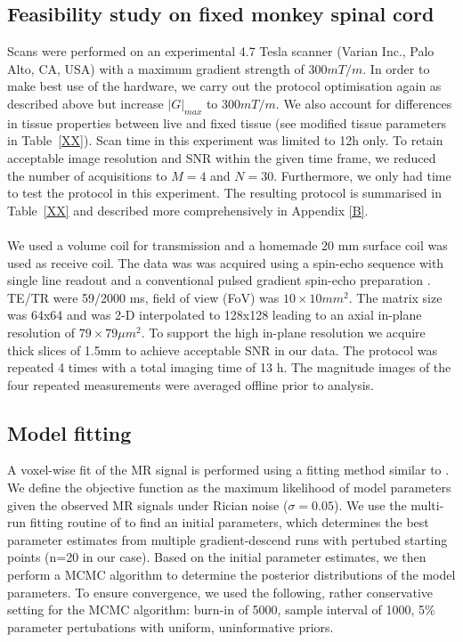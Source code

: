 \subsection{Feasibility study on fixed monkey spinal cord}
Scans were performed on an experimental 4.7 Tesla scanner (Varian Inc., Palo Alto, CA, USA) with a maximum gradient strength of $300mT/m$. In order to make best use of the hardware, we carry out the protocol optimisation again as described above but increase $|G|_{max}$ to $300mT/m$. We also account for differences in tissue properties between live and fixed tissue (see modified tissue parameters in Table~\ref{XX}). Scan time in this experiment was limited to 12h only. To retain acceptable image resolution and SNR within the given time frame, we reduced the number of acquisitions to $M=4$ and $N=30$. Furthermore, we only had time to test the {\FD} protocol in this experiment. The resulting protocol is summarised in Table~\ref{XX} and described more comprehensively in Appendix \ref{B}. 
\paragraph{}
We used a volume coil for transmission and a homemade 20 mm surface coil was used as receive coil. The data was was acquired using a spin-echo sequence with single line readout and a conventional pulsed gradient spin-echo preparation \citep{Stejskal:1965}.  TE/TR were 59/2000 ms, field of view (FoV) was $10\times 10 mm^2$. The matrix size was 64x64 and was 2-D interpolated to 128x128 leading to an axial in-plane resolution of $79 \times 79 \mu m^2$. To support the high in-plane resolution we acquire thick slices of 1.5mm to achieve acceptable \gls{SNR} in our data. The protocol was repeated 4 times with a total imaging time of 13 h. The magnitude images of the four repeated measurements were averaged offline prior to analysis.


\subsection{Model fitting}
A voxel-wise fit of the MR signal is performed using a fitting method similar to \citep{Alexander:2010}. We define the objective function as the maximum likelihood of model parameters given the observed MR signals under Rician noise ($\sigma=0.05$). We use the multi-run fitting routine of \citep{Panagiotaki:2012} to find an initial parameters, which determines the best parameter estimates from multiple gradient-descend runs with pertubed starting points (n=20 in our case). Based on the initial parameter estimates, we then perform a \gls{MCMC} algorithm to determine the posterior distributions of the model parameters. To ensure convergence, we used the following, rather conservative setting for the \gls{MCMC} algorithm: burn-in of 5000, sample interval of 1000, 5\% parameter pertubations with uniform, uninformative priors.

